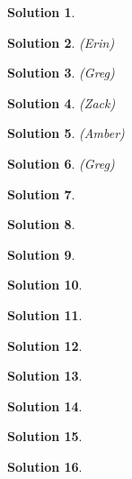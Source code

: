 \documentclass{article}
\newtheorem{solution}{Solution}
\begin{document}
\begin{solution} %
\end{solution}

\begin{solution} %
(Erin)
\end{solution}

\begin{solution} %
(Greg)


\end{solution}

\begin{solution} %
(Zack)
\end{solution}

\begin{solution} %
(Amber)

\end{solution}

\begin{solution} %
(Greg)

\end{solution}

\begin{solution}
\end{solution}

\begin{solution} %
\end{solution}

\begin{solution}
\end{solution}

\begin{solution}
\end{solution}

\begin{solution}
\end{solution}

\begin{solution}
\end{solution}

\begin{solution}
\end{solution}

\begin{solution}
\end{solution}

\begin{solution}
\end{solution}

\begin{solution}
\end{solution}
\end{document}
